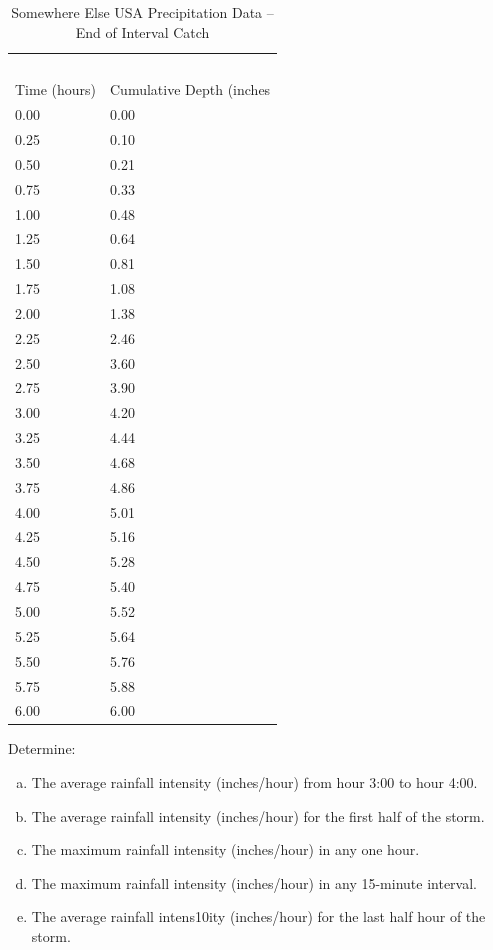 \documentclass[12pt]{article}
\begin{document}
\begin{enumerate}
\begin{table}[h!]
\centering
\caption{Somewhere Else USA Precipitation Data -- End of Interval Catch}
\begin{tabular}{p{2.0in}p{2.0in}} %
~&~\\
Time (hours) & Cumulative Depth (inches\\
\hline
\hline
0.00 & 0.00 \\
0.25 & 0.10 \\
0.50 & 0.21 \\
0.75 & 0.33 \\
1.00 & 0.48 \\
1.25 & 0.64 \\
1.50 & 0.81 \\
1.75 & 1.08 \\
2.00 & 1.38 \\
2.25 & 2.46 \\
2.50 & 3.60 \\
2.75 & 3.90 \\
3.00 & 4.20 \\
3.25 & 4.44 \\
3.50 & 4.68 \\
3.75 & 4.86 \\
4.00 & 5.01 \\
4.25 & 5.16 \\
4.50 & 5.28 \\
4.75 & 5.40 \\
5.00 & 5.52 \\
5.25 & 5.64 \\
5.50 & 5.76 \\
5.75 & 5.88 \\
6.00 & 6.00 \\
\hline
\end{tabular}
\label{tab:SomewhereElseUSARain}
\end{table}

Determine:
    \begin{enumerate}[a)]
        \item The average rainfall intensity (inches/hour) from hour 3:00 to hour 4:00. 
        \item The average rainfall intensity (inches/hour) for the first half of the storm. 
        \item The maximum rainfall intensity (inches/hour) in any one hour.  
        \item The maximum rainfall intensity (inches/hour) in any 15-minute interval. 
        \item The average rainfall intens10ity (inches/hour) for the last half hour of the storm.   
    \end{enumerate}


\end{enumerate}
\end{document}
